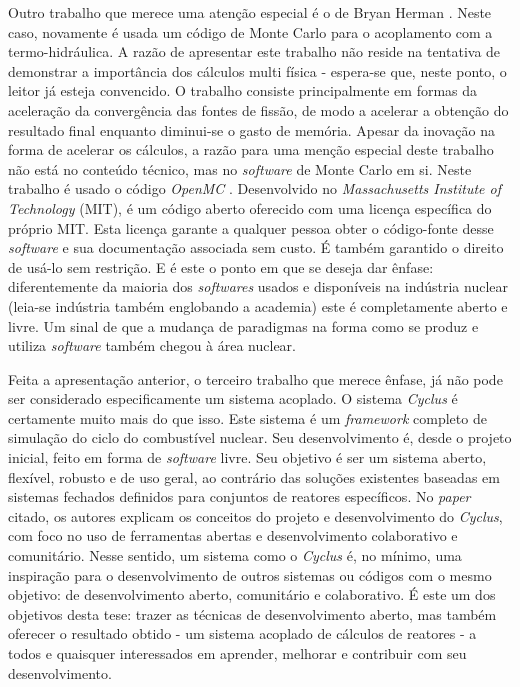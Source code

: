 Outro trabalho que merece uma atenção especial é o de Bryan Herman \cite{Herman2015}. Neste caso, novamente
é usada um código de Monte Carlo para o acoplamento com a termo-hidráulica. A razão de apresentar este trabalho
não reside na tentativa de demonstrar a importância dos cálculos multi física - espera-se que, neste ponto,
o leitor já esteja convencido. O trabalho consiste principalmente em formas da aceleração da
convergência das fontes de fissão, de modo a acelerar a obtenção do resultado final enquanto
diminui-se o gasto de memória. Apesar da inovação na forma de acelerar os cálculos, a razão para uma menção
especial deste trabalho não está no conteúdo técnico, mas no \textit{software} de Monte Carlo em si.
Neste trabalho é usado o código \textit{OpenMC} \cite{Romano2013}. Desenvolvido no \textit{Massachusetts
  Institute of Technology} (MIT), é um código aberto oferecido com uma licença específica do próprio MIT.
Esta licença garante a qualquer pessoa obter o código-fonte desse \textit{software} e sua
documentação associada sem custo. É também garantido o direito de usá-lo sem restrição.
E é este o ponto em que se deseja dar ênfase: diferentemente da maioria
dos \textit{softwares} usados e disponíveis na indústria nuclear (leia-se indústria também englobando a academia)
este é completamente aberto e livre. Um sinal de que a mudança de paradigmas na
forma como se produz e utiliza \textit{software} também chegou à área nuclear.

Feita a apresentação anterior, o terceiro trabalho que merece ênfase, já não pode ser considerado
especificamente um sistema acoplado. O sistema \textit{Cyclus} \cite{Huff2016} é certamente muito mais
do que isso. Este sistema é um \textit{framework} completo de simulação do ciclo do combustível nuclear.
Seu desenvolvimento é, desde o projeto inicial, feito em forma de \textit{software} livre. Seu objetivo é ser um sistema aberto,
flexível, robusto e de uso geral, ao contrário das soluções existentes baseadas em sistemas fechados
definidos para conjuntos de reatores específicos.
No \textit{paper} citado, os autores explicam os conceitos do projeto e desenvolvimento do \textit{Cyclus}, com
foco no uso de ferramentas abertas e desenvolvimento colaborativo e comunitário. Nesse sentido, um sistema
como o \textit{Cyclus} é, no mínimo, uma inspiração para o desenvolvimento de outros sistemas ou códigos
com o mesmo objetivo: de desenvolvimento aberto, comunitário e colaborativo. É este um dos objetivos
desta tese: trazer as técnicas de desenvolvimento aberto, mas também oferecer o resultado obtido -
um sistema acoplado de cálculos de reatores - a todos e quaisquer interessados em aprender, melhorar
e contribuir com seu desenvolvimento.

